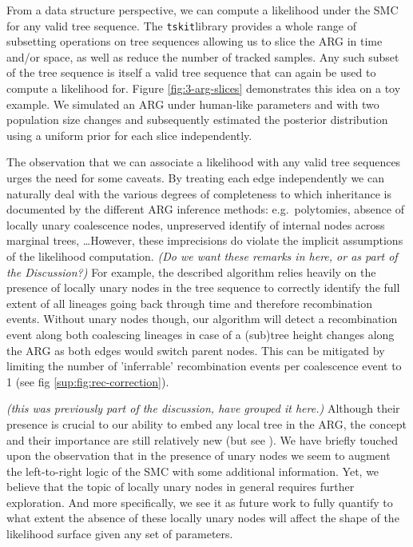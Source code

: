 \documentclass{article}
\newcommand{\tskit}[0]{\texttt{tskit}}
\newcommand{\comment}[1]{{\it \color{orange} (#1)}}
\begin{document}
From a data structure perspective, we can compute a likelihood
under the SMC for any valid tree sequence.
The \tskit library provides a whole range
of subsetting operations on tree sequences allowing us to slice
the ARG in time and/or space, as well as reduce the number of
tracked samples. Any such subset of the tree sequence is itself
a valid tree sequence that can again be used to compute a
likelihood for. Figure \ref{fig:3-arg-slices} demonstrates this idea
on a toy example. We simulated an ARG under human-like parameters and with
two population size changes and subsequently estimated the posterior
distribution using a uniform prior for each slice independently.

The observation that we can associate a likelihood with any valid tree sequences
urges the need for some caveats. By treating each edge independently we can
naturally deal with the various degrees of completeness to which inheritance
is documented by the different ARG inference methods: e.g.\ polytomies, absence
of locally unary coalescence nodes, unpreserved identify of internal nodes
across marginal trees, \dots However, these imprecisions do violate the implicit
assumptions of the likelihood computation.
\comment{Do we want these remarks in here, or as part of the Discussion?}
For example, the described algorithm relies heavily on the
presence of locally unary nodes in the tree sequence to correctly identify the
full extent of all lineages going back through time and therefore recombination
events. Without unary nodes though, our algorithm will detect a recombination
event along both coalescing lineages in case of a (sub)tree height changes along
the ARG as both edges would switch parent nodes. This can be mitigated by limiting
the number of 'inferrable' recombination events per coalescence event to 1
(see fig \ref{sup:fig:rec-correction}).

\comment{this was previously part of the discussion, have grouped it here.}
Although their presence is crucial to our ability to embed any local tree in the
ARG, the concept and their importance are still relatively new (but see
\citet{wong_general_2023}).
We have briefly touched upon the observation that in
the presence of unary nodes we seem to augment the left-to-right logic of the SMC
with some additional information. Yet, we believe that the topic of locally
unary nodes in general requires further exploration.
And more specifically, we see it as future work to fully quantify to what
extent the absence of these locally unary nodes will affect the shape of the
likelihood surface given any set of parameters.
\end{document}
